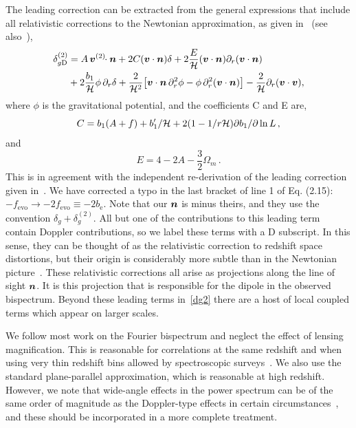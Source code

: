 The leading correction can be extracted from the general expressions that include all relativistic  corrections to the Newtonian approximation, as given in~\cite{Bertacca:2014hwa} (see also~\cite{Bertacca:2014dra,Yoo:2014sfa,DiDio:2014lka,Jolicoeur:2017nyt,DiDio:2018zmk}), 
\begin{align}
\delta^{(2)}_{g{\mathrm{D}}} &= A \, \bm{v}^{(2)}\!\!\cdot\bm {n}+2{C}(\bm{v}\cdot\bm {n})\delta +2 {\frac{E}{\mathcal{H}}}(\bm{v}\cdot\bm {n})\partial_r(\bm{v}\cdot\bm {n})\label{dg2}
\\ & \nonumber
+ 2 \frac{b_1}{\mathcal{H}}\phi\, \partial_r\delta
+ \frac{2}{\mathcal{H}^2} \big[\bm{v}\cdot\bm {n} \,\partial_r^2\phi-\phi\, \partial_r^2 (\bm{v}\cdot\bm {n}) \big] - \frac{2}{\mathcal{H}}\partial_r (\bm{v}\cdot\bm{v}), 
\end{align}
where $\phi$ is the gravitational potential, and the coefficients C and E are,
\begin{equation}
    C = b_1(A + f)+{b_1'/ \mathcal{H}}+ 2(1-{1/ r\mathcal{H}} ){\partial b_1/ \partial\ln L}\,,
\end{equation}
and
\begin{equation}
E = {4-2A-{\frac{3}{2}}\Omega_m}\,.
\end{equation}
This is in agreement with the independent re-derivation of the leading correction given in~\cite{DiDio:2018zmk}. We have corrected a typo in the last bracket of line 1 of Eq. (2.15): $-f_{\mathrm{evo}}\to -2f_{\mathrm{evo}}\equiv -2b_{\mathrm{e}}$. Note that our $\bm {n}$ is minus theirs, and they use the convention $\delta_g+\delta^{(2)}_g$.
All but one of the contributions to this leading term contain Doppler contributions, so we label these terms with a D subscript. In this sense, they can be thought of as the relativistic correction to redshift space distortions, but their origin is considerably more subtle than in the Newtonian picture~\citep{Bertacca:2014dra,DiDio:2018zmk}. These relativistic corrections all arise as projections along the line of sight $\bm {n}$. It is this projection that is responsible for the dipole in the observed bispectrum. Beyond these leading terms in~\eqref{dg2} there are a host of local coupled terms which appear on larger scales. 

We follow most work on the Fourier bispectrum and neglect the effect of lensing magnification. This is reasonable for correlations at the same redshift and when using very thin redshift bins allowed by spectroscopic surveys~\citep{DiDio:2018unb}. We also use the standard plane-parallel approximation, which is reasonable at high redshift. However, we note that wide-angle effects in the power spectrum can be of the same order of magnitude as the Doppler-type effects in certain circumstances~\citep{Tansella:2017rpi}, and these should be incorporated in a more complete treatment.

